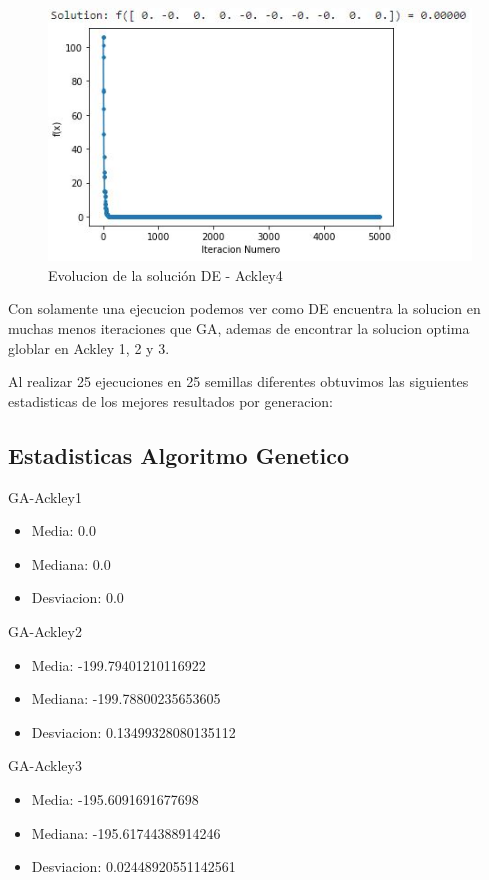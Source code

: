 \documentclass[10pt]{article}
\begin{document}
\begin{figure}[H]
\centerline{\includegraphics{ack-4-de.jpg}}
\caption{Evolucion de la solución DE - Ackley4}
\label{fig_8}
\end{figure}

Con solamente una ejecucion podemos ver como DE encuentra la solucion en muchas menos iteraciones que GA, ademas de encontrar la solucion optima globlar en Ackley 1, 2 y 3.

Al realizar 25 ejecuciones en 25 semillas diferentes obtuvimos las siguientes estadisticas de los mejores resultados por generacion: 

\subsection{Estadisticas Algoritmo Genetico}
GA-Ackley1
\begin{itemize}
\item
Media:  0.0 
\item%
Mediana:  0.0 
\item%
Desviacion:  0.0
\end{itemize}

GA-Ackley2
\begin{itemize}
\item
Media:  -199.79401210116922 
\item%
Mediana:  -199.78800235653605 
\item%
Desviacion:  0.13499328080135112
\end{itemize}

GA-Ackley3
\begin{itemize}
\item
Media:  -195.6091691677698 
\item%
Mediana:  -195.61744388914246 
\item%
Desviacion:  0.02448920551142561
\end{itemize}
\end{document}
